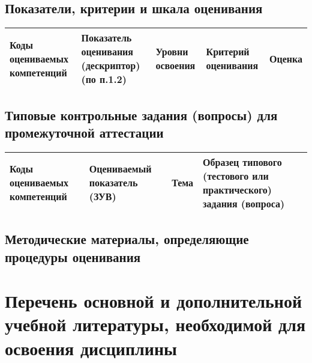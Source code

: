 \documentclass[a4paper,12pt]{article}
\begin{document}
\subsection{Показатели, критерии и шкала оценивания}

\begin{longtable}{|p{15mm}|p{53mm}|p{16mm}|p{43mm}|p{14mm}|}
\hline
  \centering\small Коды оцениваемых компетенций
& \centering Показатель оценивания (дескриптор) (по п.1.2) 
& \centering\small Уровни освоения 
& \centering Критерий оценивания 
& \centering\small\arraybackslash Оценка
\\
\hline

\end{longtable}



\subsection{Типовые контрольные задания (вопросы) для промежуточной аттестации}

\begin{longtable}{|p{15mm}|p{42mm}|p{17mm}|p{70mm}|}
\hline
\centering\small Коды оцениваемых компетенций  & \centering Оцениваемый показатель (ЗУВ) 
& \centering Тема  & \centering\arraybackslash Образец типового (тестового или практического) задания (вопроса)
\\
\hline

\end{longtable}



\subsection{Методические материалы, определяющие процедуры оценивания}




\newpage
\section{Перечень основной и дополнительной учебной литературы, необходимой для освоения дисциплины}
\end{document}
